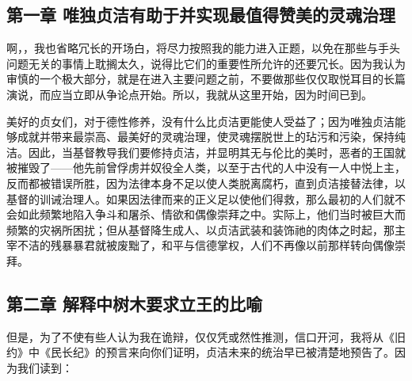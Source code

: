 \par


\subsection{第一章  唯独贞洁有助于并实现最值得赞美的灵魂治理}

啊，，我也省略冗长的开场白，将尽力按照我的能力进入正题，以免在那些与手头问题无关的事情上耽搁太久，说得比它们的重要性所允许的还要冗长。因为我认为审慎的一个极大部分，就是在进入主要问题之前，不要做那些仅仅取悦耳目的长篇演说，而应当立即从争论点开始。所以，我就从这里开始，因为时间已到。\par

美好的贞女们，对于德性修养，没有什么比贞洁更能使人受益了；因为唯独贞洁能够成就并带来最崇高、最美好的灵魂治理，使灵魂摆脱世上的玷污和污染，保持纯洁。因此，当基督教导我们要修持贞洁，并显明其无与伦比的美时，恶者的王国就被摧毁了——他先前曾俘虏并奴役全人类，以至于古代的人中没有一人中悦上主，反而都被错误所胜，因为法律本身不足以使人类脱离腐朽，直到贞洁接替法律，以基督的训诫治理人。如果因法律而来的正义足以使他们得救，那么最初的人们就不会如此频繁地陷入争斗和屠杀、情欲和偶像崇拜之中。实际上，他们当时被巨大而频繁的灾祸所困扰；但从基督降生成人、以贞洁武装和装饰祂的肉体之时起，那主宰不洁的残暴暴君就被废黜了，和平与信德掌权，人们不再像以前那样转向偶像崇拜。\par


\subsection{第二章  解释中树木要求立王的比喻}

但是，为了不使有些人认为我在诡辩，仅仅凭或然性推测，信口开河，我将从《旧约》中《民长纪》的预言来向你们证明，贞洁未来的统治早已被清楚地预告了。因为我们读到：\par

